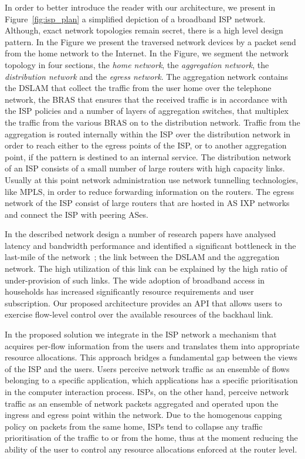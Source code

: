 In order to better introduce the reader with our architecture, we present in
Figure~\ref{fig:isp_plan} a simplified depiction of a broadband ISP network.
Although, exact network topologies remain secret, there is a high level design
pattern. In the Figure we present the traversed network devices by a packet send
from the home network to the Internet.  In the Figure, we segment the network
topology in four sections, the {\it home network}, the {\it aggregation
  network}, the {\it distribution network} and the {\it egress network}. The
aggregation network contains the DSLAM that collect the traffic from the user
home over the telephone network, the BRAS that ensures that the received traffic
is in accordance with the ISP policies and a number of layers of aggregation
switches, that multiplex the traffic from the various BRAS on to the
distribution network. Traffic from the aggregation is routed internally within
the ISP over the distribution network in order to reach either to the egress
points of the ISP, or to another aggregation point, if the pattern is destined
to an internal service. The distribution network of an ISP consists of a small
number of large routers with high capacity links. Usually at this point network
administration use network tunnelling technologies, like MPLS, in order to
reduce forwarding information on the routers.  The egress network of the ISP
consist of large routers that are hosted in AS IXP networks and connect the ISP
with peering ASes. 

In the described network design a number of research papers have analysed
latency and bandwidth performance and identified a significant bottleneck in the
last-mile of the network~\cite{Dischinger:2007bg,Akella2003}; the link between
the DSLAM and the aggregation network. The high utilization of this link can be
explained by the high ratio of under-provision of such links. The wide adoption
of broadband access in households has increased significantly resource
requirements and user subscription. Our proposed architecture provides an API
that allows users to exercise flow-level control over the available resources of
the backhaul link.

In the proposed solution we integrate in the ISP network a mechanism that
acquires per-flow information from the users and translates them into
appropriate resource allocations. This approach bridges a fundamental gap
between the views of the ISP and the users. Users perceive network traffic as an
ensemble of flows belonging to a specific application, which applications has a
specific prioritisation in the computer interaction process.  ISPs, on the other
hand, perceive network traffic as an ensemble of network packets aggregated and
operated upon the ingress and egress point within the network. Due to the
homogenous capping policy on packets from the same home, ISPs tend to collapse
any traffic prioritisation of the traffic to or from the home, thus at the
moment reducing the ability of the user to control any resource allocations
enforced at the router level. 

